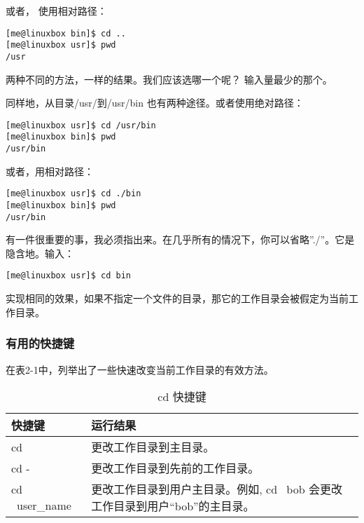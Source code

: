 \par 或者， 使用相对路径：

\begin{lstlisting}
[me@linuxbox bin]$ cd ..
[me@linuxbox usr]$ pwd
/usr
\end{lstlisting}

\par 两种不同的方法，一样的结果。我们应该选哪一个呢？ 输入量最少的那个。

\par 同样地，从目录/usr/到/usr/bin 也有两种途径。或者使用绝对路径：

\begin{lstlisting}
[me@linuxbox usr]$ cd /usr/bin
[me@linuxbox bin]$ pwd
/usr/bin
\end{lstlisting}

\par 或者，用相对路径：

\begin{lstlisting}
[me@linuxbox usr]$ cd ./bin
[me@linuxbox bin]$ pwd
/usr/bin
\end{lstlisting}

\par 有一件很重要的事，我必须指出来。在几乎所有的情况下，你可以省略”./”。它是隐含地。输入：
\begin{lstlisting}
[me@linuxbox usr]$ cd bin
\end{lstlisting}

\par 实现相同的效果，如果不指定一个文件的目录，那它的工作目录会被假定为当前工作目录。


\subsubsection{有用的快捷键} %
\label{ssub:有用的快捷键}
在表2-1中，列举出了一些快速改变当前工作目录的有效方法。


\begin{table}[ht!]
\caption{cd 快捷键}
\label{table0}
\centering
\begin{tabular}{p{3cm}p{8cm}}
\hline
 快捷键 & 运行结果 \\
\hline
  cd	& 更改工作目录到主目录。 \\
  cd -	& 更改工作目录到先前的工作目录。\\
cd ~user\_name	& 更改工作目录到用户主目录。例如, cd ~bob 会更改工作目录到用户“bob”的主目录。\\
\hline
\end{tabular}
\end{table}

